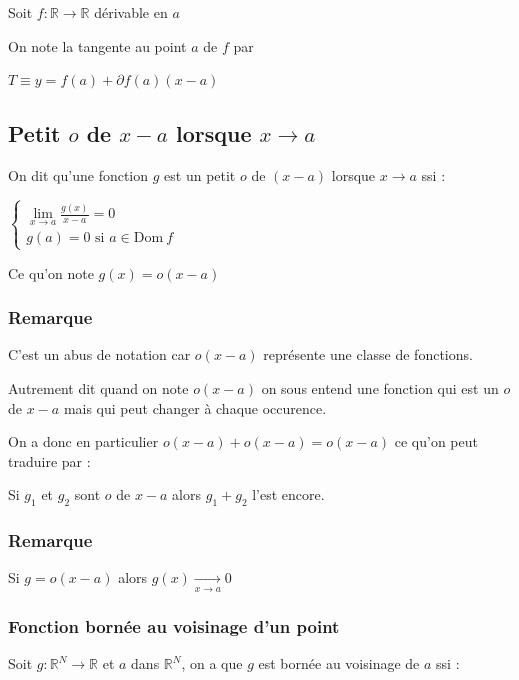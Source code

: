 \documentclass[a4paper,10pt]{article}
\newcommand{\ap}{\rightarrow}
\newcommand{\Dom}{\mathrm{Dom}\:}
\newcommand{\R}{\mathbb{R}}
\newcommand{\conv}[1]{\mathop{\longrightarrow}\limits_{#1}}
\newcommand{\clim}[1]{\lim\limits_{#1}}
\begin{document}
Soit $f : \R \ap \R$ dérivable en $a$

On note la tangente au point $a$ de $f$ par

$T \equiv y = f(a) + \partial f(a) (x - a)$

\begin{figure}[h]
\end{figure}

\subsection{Petit $o$ de $x-a$ lorsque $x \ap a$}

On dit qu'une fonction $g$ est un petit $o$ de $(x-a)$ lorsque $x \ap a$ ssi :

$\begin{cases}
	\clim{x \ap a} \frac{g(x)}{x-a} = 0\\
	g(a) = 0 \mbox{ si } a \in \Dom f
\end{cases}$

Ce qu'on note $g(x) = o(x-a)$

\subsubsection{Remarque}

C'est un abus de notation car $o(x-a)$ représente une classe de fonctions.

Autrement dit quand on note $o(x-a)$ on sous entend une fonction qui est un $o$ de $x-a$ mais qui peut changer à chaque occurence.

On a donc en particulier $o(x-a) + o(x-a) = o(x-a)$ ce qu'on peut traduire par :

Si $g_1$ et $g_2$ sont $o$ de $x-a$ alors $g_1 + g_2$ l'est encore.

\subsubsection{Remarque}

Si $g = o(x-a)$ alors $g(x) \conv{x \ap a} 0$

\subsubsection{Fonction bornée au voisinage d'un point}

Soit $g : \R^N \ap \R$ et $a$ dans $\R^N$, on a que $g$ est bornée au voisinage de $a$ ssi :
\end{document}
